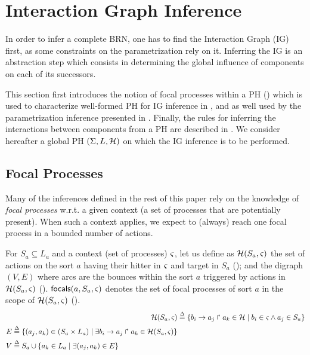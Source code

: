 \section{Interaction Graph Inference}\label{sec:infer-IG}

In order to infer a complete BRN, one has to find the Interaction Graph (IG) first, as some
constraints on the parametrization rely on it.
Inferring the IG is an abstraction step which consists in determining the global influence of
components on each of its successors.

This section first introduces the notion of focal processes within a PH
() which is used to characterize well-formed PH for IG inference
in , and as well used by the parametrization inference presented in .
Finally, the rules for inferring the interactions between components from a PH are
described in .
We consider hereafter a global PH $(\Sigma,L,\mathcal{H})$ on which the IG inference is to be
performed.

\subsection{Focal Processes}\label{ssec:focal}

Many of the inferences defined in the rest of this paper rely on the knowledge of \emph{focal
processes} w.r.t. a given context (a set of processes that are potentially present).
When such a context applies, we expect to (always) reach one focal process in a bounded number of
actions.

For $S_a\subseteq L_a$ and a context (set of processes) $\varsigma$, let us define as $\mathcal{H}(S_a,\varsigma)$
the set of actions on the sort $a$ having their hitter in $\varsigma$ and target in $S_a$
();
and the digraph $(V, E)$ where arcs are the bounces within the sort $a$ triggered by actions
in $\mathcal{H}(S_a,\varsigma)$ ().
$\mathsf{focals}(a,S_a,\varsigma)$ denotes the set of focal processes of sort $a$ in the scope of
$\mathcal{H}(S_a,\varsigma)$ ().
\begin{align}
\mathcal{H}(S_a,\varsigma) & \stackrel{\Delta}= \{ b_i\rightarrow a_j\Rsh a_k\in\mathcal{H} \mid b_i\in\varsigma \wedge a_j\in S_a \}
\label{eq:PHa-ctx}
\\
\begin{split}
E  & \stackrel{\Delta}= \{(a_j,a_k)\in (S_a \times L_a) \mid 
			\exists b_i\rightarrow a_j\Rsh a_k\in \mathcal{H}(S_a,\varsigma) \}
\\
V & \stackrel{\Delta}= S_a \cup \{ a_k\in L_a\mid \exists (a_j,a_k)\in E\}
\end{split}
\label{eq:bounce-graph}
\end{align}

